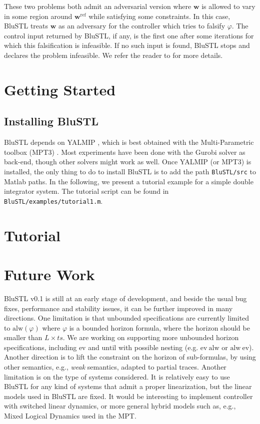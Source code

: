 \documentclass[hyperref, xcolor=dvipsnames, 10pt]{article} %
\def \w {\mathbf{w}}
\def \f {\varphi}
\def\wr {\w^{\text{ref}}}
\def\G {\text{alw}}
\def\F {\text{ev}}
\def\until {\text{until}}
\begin{document}
These two problems both admit an adversarial version where $\w$ is allowed to vary in some region
around $\wr$ while satisfying some constraints. In this case, BluSTL treats $\w$ as an adversary
for the controller which tries to falsify $\f$. The control input returned by BluSTL, if any, is the
first one after some iterations for which this falsification is infeasible. If no such input is
found, BluSTL stops and declares the problem infeasible. We refer the reader to \cite{HSCC15} for more
details. 

%
\section{Getting Started}
%
\subsection{Installing BluSTL}
BluSTL depends on YALMIP \cite{YALMIP}, which is best obtained with the Multi-Parametric toolbox
(MPT3) \cite{MPT3}. Most experiments have been done with the Gurobi solver \cite{gurobi} as
back-end, though other solvers might work as well. Once YALMIP (or MPT3) is installed, the only thing to do to
install BluSTL is to add the path \verb+BluSTL/src+ to Matlab paths. In the following, we present a
tutorial example for a simple double integrator system. The tutorial script can be found in \verb+BluSTL/examples/tutorial1.m+.

%
\section{Tutorial}
% 




%
\section{Future Work}
%
BluSTL v0.1 is still at an early stage of development, and beside the usual bug fixes,
performance and stability issues, it can be further improved in many directions. One limitation is
that unbounded specifications are currently limited to $\G (\f)$ where $\f$ is a bounded horizon
formula, where the horizon should be smaller than $L\times ts$. We are working on supporting more
unbounded horizon specifications, including $\F$ and $\until$ with possible nesting (e.g. $\F\ \G$
or $\G\ \F$). Another direction is to lift the constraint on the horizon of sub-formulas, by using
other semantics, e.g., \emph{weak} semantics, adapted to partial traces. Another limitation is on
the type of systems considered. It is relatively easy to use BluSTL for any kind of systems that
admit a proper linearization, but the linear models used in BluSTL are fixed. It would be
interesting to implement controller with switched linear dynamics, or more general hybrid models
such as, e.g., Mixed Logical Dynamics used in the MPT.  






%
\end{document}
